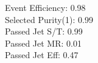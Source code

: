 Event Efficiency:   0.98\\ 
Selected Purity(1): 0.99\\ 
Passed Jet S/T:     0.99\\ 
Passed Jet MR:      0.01\\ 
Passed Jet Eff:     0.47